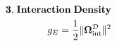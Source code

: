 \documentclass[preview]{standalone}
\begin{document}
\begin{align*}
\special{dvisvgm:raw <g id='unique000'>}\mathbf{3.\;Interaction\;Density}\\g_E=\frac{1}{2}\|\mathbf{\Omega}_{\text{int}}^{\mathcal{D}}\|^2\special{dvisvgm:raw </g>}
\end{align*}
\end{document}
